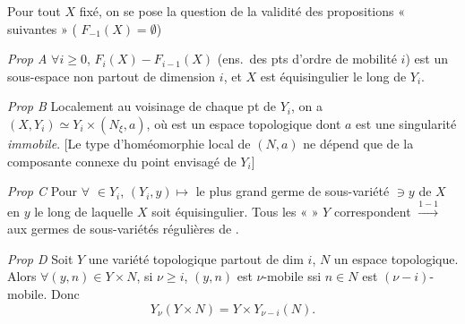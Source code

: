 \documentclass[11pt,a4paper]{article}
\begin{document}
Pour tout $X$ fixé, on se pose la question  de la
validité des propositions « suivantes » ( $F_{-1}(X) =
\emptyset$)

\emph{Prop A} $\forall i \geq 0$,  \struck{\ill{}} $F_i(X) -
F_{i-1}(X)$  (ens.\ des pts d'ordre
de mobilité $i$) est un sous-espace non  partout de
dimension $i$, et $X$ est équisingulier le long de $Y_i$.


\emph{Prop B} Localement au voisinage de chaque pt de $Y_i$, on a $(X,
Y_i) \simeq Y_i \times (N_\xi, a)$, où \ill{} est un espace topologique dont
$a$ est une singularité \emph{immobile}. [Le type d'homéomorphie local de
$(N, a)$ ne dépend que de la composante connexe du point envisagé de
$Y_i$]

\emph{Prop C} Pour $\forall$  $\in Y_i$, $(Y_i, y) \mapsto$ le
plus grand germe de sous-variété $\ni y$ de $X$ en $y$ le long de laquelle
$X$ soit équisingulier. Tous les «  » $Y$ correspondent
$\xrightarrow{1-1}$ aux germes  de sous-variétés régulières
 de  \struck{\ill{}}.

\emph{Prop D} Soit $Y$ \struck{\ill{}} une variété topologique partout de
dim $i$, $N$ un espace topologique. Alors \struck{\ill{}} $\forall (y, n)
\in Y \times N$,   si $\nu \geq i$, $(y, n)$  est
$\nu$-mobile ssi $n \in N$ est $(\nu - i)$-mobile. Donc
\[
  Y_\nu(Y \times N) = Y \times Y_{\nu - i}(N).
\]
\end{document}
